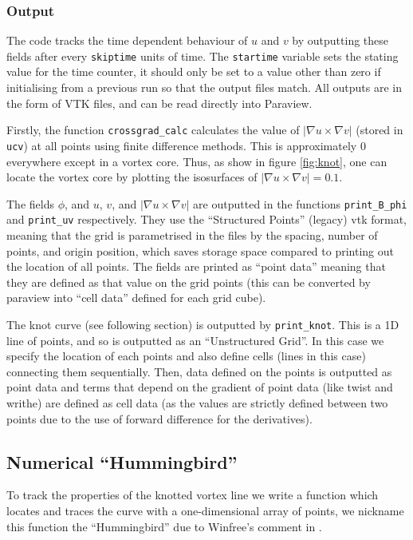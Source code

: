\documentclass[notitlepage,aps,amsmath,amssymb,11pt]{revtex4-1}
\newcommand{\norm}[1]{\left| #1 \right|}
\begin{document}
\subsubsection{Output}

The code tracks the time dependent behaviour of $u$ and $v$ by outputting these fields after every \verb'skiptime' units of time. The \verb'startime' variable sets the stating value for the time counter, it should only be set to a value other than zero if initialising from a previous run so that the output files match. All outputs are in the form of VTK files, and can be read directly into Paraview. 

Firstly, the function \verb'crossgrad_calc' calculates the value of $\norm{\nabla u \times \nabla v}$ (stored in \verb'ucv') at all points using finite difference methods. This is approximately 0 everywhere except in a vortex core. Thus, as show in figure \ref{fig:knot}, one can locate the vortex core by plotting the isosurfaces of $\norm{\nabla u \times \nabla v} = 0.1$.

The fields $\phi$, and $u$, $v$, and $\norm{\nabla u \times \nabla v}$ are outputted in the functions \verb'print_B_phi' and \verb'print_uv' respectively. They use the ``Structured Points'' (legacy) vtk format, meaning that the grid is parametrised in the files by the spacing, number of points, and origin position, which saves storage space compared to printing out the location of all points. The fields are printed as ``point data'' meaning that they are defined as that value on the grid points (this can be converted by paraview into ``cell data'' defined for each grid cube).

The knot curve (see following section) is outputted by \verb'print_knot'. This is a 1D line of points, and so is outputted as an ``Unstructured Grid''. In this case we specify the location of each points and also define cells (lines in this case) connecting them sequentially. Then, data defined on the points is outputted as point data and terms that depend on the gradient of point data (like twist and writhe) are defined as cell data (as the values are strictly defined between two points due to the use of forward difference for the derivatives).

\subsection{Numerical ``Hummingbird''}

To track the properties of the knotted vortex line we write a function which locates and traces the curve with a one-dimensional array of points, we nickname  this function the ``Hummingbird'' due to Winfree's comment in \cite{Winfree1990}. 
\end{document}
